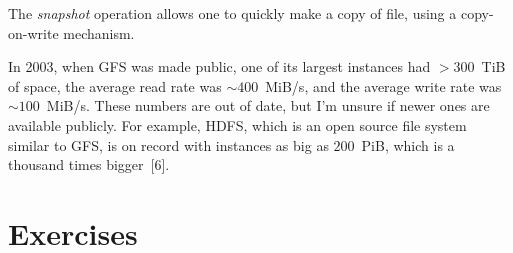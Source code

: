 The \emph{snapshot} operation allows one to quickly make a copy of file,
  using a copy-on-write mechanism.

\smallskip

In 2003, when GFS was made public,
  one of its largest instances had $>300$~TiB of space,
  the average read rate was $\sim400$~MiB/s,
  and the average write rate was $\sim100$~MiB/s.
These numbers are out of date, but I'm unsure if newer ones are available publicly.
For example, HDFS, which is an open source file system similar to GFS,
  is on record with instances as big as $200$~PiB,
  which is a thousand times bigger~[6].


\section*{Exercises}

